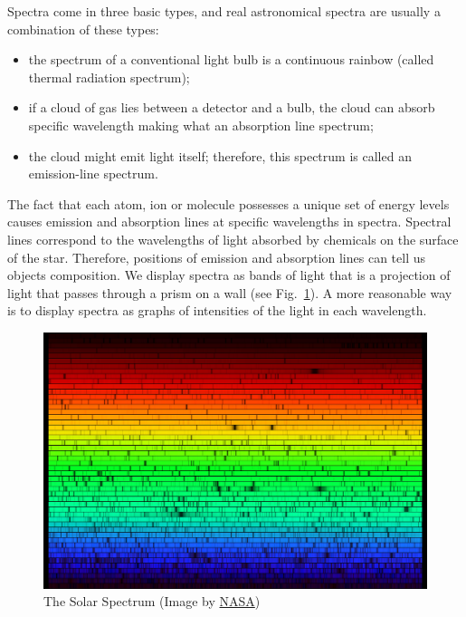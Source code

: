 \documentclass[thesis=M,english]{FITthesis}[2012/10/20]
\begin{document}
Spectra come in three basic types, and real astronomical spectra are usually a combination of these types:

\begin{itemize}
	\item the spectrum of a conventional light bulb is a continuous rainbow (called thermal radiation spectrum);
	\item if a cloud of gas lies between a detector and a bulb,
		the cloud can absorb specific wavelength making what an absorption line spectrum;
	\item the cloud might emit light itself; therefore, this spectrum is called an emission-line spectrum.
\end{itemize}

The fact that each atom, ion or molecule possesses a unique set of energy levels
causes emission and absorption lines at specific wavelengths in spectra.
Spectral lines correspond to the wavelengths of light absorbed by chemicals on the surface of the star.
Therefore, positions of emission and absorption lines can tell us objects composition.
We display spectra as bands of light that is a projection of light that passes through a prism on a wall
(see Fig.~\ref{solar_spectrum}).
A more reasonable way is to display spectra as graphs of intensities of the light in each wavelength.

\begin{figure}
	\includegraphics[width=\textwidth]{img/solarspectrum.jpg}
	\caption{The Solar Spectrum (Image by \href{https://solarsystem.nasa.gov/resources/390/the-solar-spectrum/}{NASA})}
	\label{solar_spectrum}
\end{figure}
\end{document}
